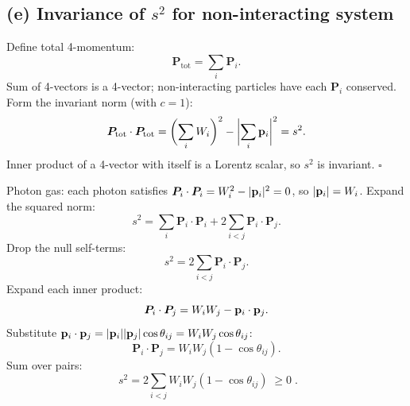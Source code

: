 \documentclass[11pt]{article}
\begin{document}
\begin{center}
\end{center}

\subsection*{(e) Invariance of $s^2$ for non-interacting system}

Define total 4-momentum:
\[
\bm P_\text{tot} = \sum_i \bm P_i.
\]
Sum of 4-vectors is a 4-vector; non-interacting particles have each $\bm P_i$ conserved.
Form the invariant norm (with $c=1$):
\[
\bm P_\text{tot}\cdot\bm P_\text{tot} = \biggl(\sum_i W_i\biggr)^2 - \biggl|\sum_i\vb p_i\biggr|^2 = s^2.
\]
Inner product of a 4-vector with itself is a Lorentz scalar, so $s^2$ is invariant. \hfill$\square$

Photon gas: each photon satisfies $\bm P_i\cdot\bm P_i = W_i^2 - |\vb p_i|^2 = 0$, so $|\vb p_i|=W_i$. Expand the squared norm:
\[
s^2 = \sum_i \bm P_i\cdot\bm P_i + 2\sum_{i<j}\bm P_i\cdot\bm P_j.
\]
Drop the null self-terms:
\[
s^2 = 2\sum_{i<j}\bm P_i\cdot\bm P_j.
\]
Expand each inner product:
\[
\bm P_i\cdot\bm P_j = W_i W_j - \vb p_i\cdot\vb p_j.
\]
Substitute $\vb p_i\cdot\vb p_j = |\vb p_i||\vb p_j|\cos\theta_{ij} = W_i W_j\cos\theta_{ij}$:
\[
\bm P_i\cdot\bm P_j = W_i W_j(1-\cos\theta_{ij}).
\]
Sum over pairs:
\[
\boxed{\;s^2 = 2\sum_{i<j} W_i W_j(1-\cos\theta_{ij})\;\geq 0\;}.
\]

\end{document}
